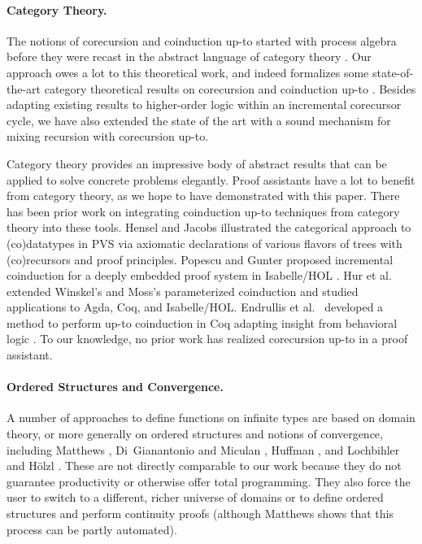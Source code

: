 \documentclass[preprint,draft]
{sigplanconf}
\newcommand{\<}{\langle}
\renewcommand{\>}{\rangle}
\begin{document}
\paragraph{Category Theory.}
The notions of corecursion and coinduction up-to started with process algebra
\cite{san-bis, RuttenProcAsTerms} before they were
recast in the abstract language of category theory
\cite{BartelsGeneralizedCoind,turi-plotkin97,klin11-bialgebras,milius-modular,jacobs06-distrib,rot-uptoCoind,hinze-adventure}.
Our approach owes a lot to this theoretical work, and indeed formalizes some state-of-the-art
category theoretical results on corecursion and coinduction up-to \cite{milius-modular,rot-uptoCoind}.
Besides adapting existing results to higher-order logic within an incremental corecursor cycle,
we have also extended the state of the art with a sound mechanism for mixing recursion with corecursion up-to.




Category theory provides an impressive body of {\relax abstract} results
that can be applied to solve concrete problems elegantly.
Proof assistants have a lot to benefit from category theory, as we hope to have demonstrated
with this paper.
There has been prior work on integrating coinduction up-to techniques from
category theory into these tools. Hensel and Jacobs
\cite{hensel-interatedRecursion} illustrated the categorical approach to
(co)data\-types in PVS via axiomatic declarations of various flavors of
trees with (co)recursors and proof principles. Popescu and Gunter proposed
incremental coinduction for a deeply embedded proof system in Isabelle\slash HOL
\cite{pop-Coind}. Hur et al.\ \cite{HurNDV13} extended Winskel's
\cite{winskel-nu} and Moss's \cite{moss-param} parameterized coinduction and
studied applications to Agda, Coq, and Isabelle\slash HOL. Endrullis et al.\
\cite{endrulis-circ} developed a method to perform up-to coinduction in Coq adapting insight from behavioral logic \cite{circCALCO09theory}.
To our knowledge, no prior work has realized corecursion up-to in a
proof assistant.

\paragraph{Ordered Structures and Convergence.}
A number of approaches to define functions on infinite types are based on domain
theory, or more generally on ordered structures and notions of convergence, including Matthews
\cite{matthews-rec-coind}, Di~Gianantonio and Miculan \cite{miculan-unifying},
Huffman \cite{huffman-2009}, and Lochbihler and H\"olzl
\cite{lochbihler-hoelzl-2014}. These are not directly comparable to our work
because they do not guarantee productivity or otherwise offer total programming.
They also force the user to switch to a different, richer universe of domains or
to define ordered structures and perform continuity proofs (although Matthews
shows that this process can be partly automated).
\end{document}
